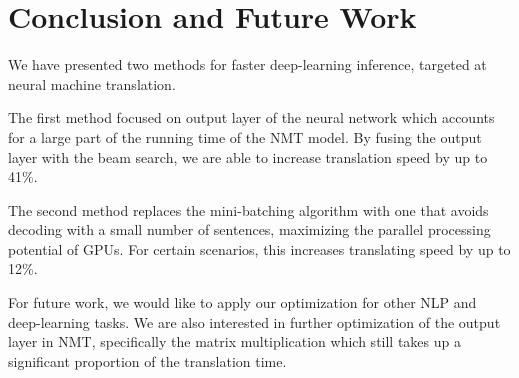 \documentclass[11pt,a4paper]{article}
\begin{document}
\section{Conclusion and Future Work}

We have presented two methods for faster deep-learning inference, targeted at neural machine translation. 

The first method focused on output layer of the neural network which accounts for a large part of the running time of the NMT model. By fusing the output layer with the beam search, we are able to increase translation speed by up to 41\%.

The second method replaces the mini-batching algorithm with one that avoids decoding with a small number of sentences, maximizing the parallel processing potential of GPUs. For certain scenarios, this increases translating  speed by up to 12\%.

For future work, we would like to apply our optimization for other NLP and deep-learning tasks. We are also interested in further optimization of the output layer in NMT, specifically the matrix multiplication which still takes up a significant proportion of the translation time.




\end{document}
